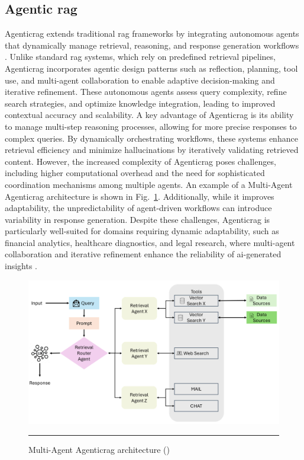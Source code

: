\subsection*{Agentic \gls{rag}}\label{sec:agentic-rag}
Agentic\gls{rag} extends traditional \gls{rag} frameworks by integrating autonomous agents that dynamically manage retrieval, reasoning, and response generation workflows \cite{singh2025}.
Unlike standard \gls{rag} systems, which rely on predefined retrieval pipelines, Agentic\gls{rag} incorporates agentic design patterns such as reflection, planning, tool use, and multi-agent collaboration to enable adaptive decision-making and iterative refinement.
These autonomous agents assess query complexity, refine search strategies, and optimize knowledge integration, leading to improved contextual accuracy and scalability.
A key advantage of Agentic\gls{rag} is its ability to manage multi-step reasoning processes, allowing for more precise responses to complex queries.
By dynamically orchestrating workflows, these systems enhance retrieval efficiency and minimize hallucinations by iteratively validating retrieved content.
However, the increased complexity of Agentic\gls{rag} poses challenges, including higher computational overhead and the need for sophisticated coordination mechanisms among multiple agents.
An example of a Multi-Agent Agentic\gls{rag} architecture is shown in Fig.~\ref{fig:multi-agent-agentic-rag}.
Additionally, while it improves adaptability, the unpredictability of agent-driven workflows can introduce variability in response generation.
Despite these challenges, Agentic\gls{rag} is particularly well-suited for domains requiring dynamic adaptability, such as financial analytics, healthcare diagnostics, and legal research, where multi-agent collaboration and iterative refinement enhance the reliability of \gls{ai}-generated insights \cite{singh2025}.

\begin{figure}[htbp]
    \centering
 \includegraphics[width=.9\textwidth]{figures/literature-review/multi-agent-agentic-rag.png}
     \rule{35em}{0.5pt}
    \caption{Multi-Agent Agentic\gls{rag} architecture (\textcite{singh2025})}
 \label{fig:multi-agent-agentic-rag}
\end{figure}

